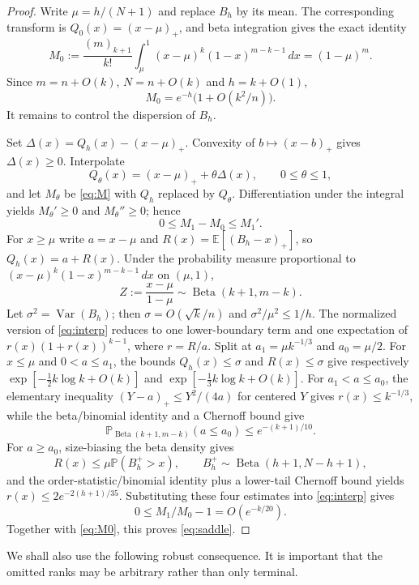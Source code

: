 \documentclass[11pt]{article}
\newcommand{\Pp}{\mathbb P}
\newcommand{\Ee}{\mathbb E}
\newcommand{\1}{\mathbf 1}
\newcommand{\Beta}{\operatorname{Beta}}
\newcommand{\fall}[2]{(#1)_{#2}}
\begin{document}
\begin{proof}
Write $\mu=h/(N+1)$ and replace $B_h$ by its mean.  The corresponding transform is
$Q_0(x)=(x-\mu)_+$, and beta integration gives the exact identity
\begin{equation}\label{eq:M0}
 M_0:=\frac{\fall m{k+1}}{k!}
 \int_\mu^1(x-\mu)^k(1-x)^{m-k-1}\,dx=(1-\mu)^m.
\end{equation}
Since $m=n+O(k)$, $N=n+O(k)$ and $h=k+O(1)$,
\[
 M_0=e^{-h}\bigl(1+O(k^2/n)\bigr).
\]
It remains to control the dispersion of $B_h$.

Set $\Delta(x)=Q_h(x)-(x-\mu)_+$.  Convexity of $b\mapsto(x-b)_+$ gives
$\Delta(x)\ge0$.  Interpolate
\[
 Q_\theta(x)=(x-\mu)_++\theta\Delta(x),\qquad0\le\theta\le1,
\]
and let $M_\theta$ be \eqref{eq:M} with $Q_h$ replaced by $Q_\theta$.
Differentiation under the integral yields $M_\theta'\ge0$ and $M_\theta''\ge0$;
hence
\begin{equation}\label{eq:interp}
 0\le M_1-M_0\le M_1'.
\end{equation}
For $x\ge\mu$ write $a=x-\mu$ and
$R(x)=\Ee[(B_h-x)_+]$, so $Q_h(x)=a+R(x)$.
Under the probability measure proportional to
$(x-\mu)^k(1-x)^{m-k-1}\,dx$ on $(\mu,1)$,
\[
 Z:=\frac{x-\mu}{1-\mu}\sim\Beta(k+1,m-k).
\]
Let $\sigma^2=\operatorname{Var}(B_h)$; then
$\sigma=O(\sqrt{k}/n)$ and $\sigma^2/\mu^2\le1/h$.
The normalized version of \eqref{eq:interp} reduces to one lower-boundary term and
one expectation of
$r(x)(1+r(x))^{k-1}$, where $r=R/a$.
Split at
$a_1=\mu k^{-1/3}$ and $a_0=\mu/2$.
For $x\le\mu$ and $0<a\le a_1$, the bounds
$Q_h(x)\le\sigma$ and $R(x)\le\sigma$ give respectively
$\exp[-\tfrac12k\log k+O(k)]$ and
$\exp[-\tfrac13k\log k+O(k)]$.
For $a_1<a\le a_0$, the elementary inequality
$(Y-a)_+\le Y^2/(4a)$ for centered $Y$ gives
$r(x)\le k^{-1/3}$, while the beta/binomial identity and a Chernoff bound give
\[
 \Pp_{\Beta(k+1,m-k)}(a\le a_0)\le e^{-(k+1)/10}.
\]
For $a\ge a_0$, size-biasing the beta density gives
\[
 R(x)\le\mu\Pp(B_h^+>x),\qquad B_h^+\sim\Beta(h+1,N-h+1),
\]
and the order-statistic/binomial identity plus a lower-tail Chernoff bound yields
$r(x)\le2e^{-2(h+1)/35}$.
Substituting these four estimates into \eqref{eq:interp} gives
\[
 0\le M_1/M_0-1=O(e^{-k/20}).
\]
Together with \eqref{eq:M0}, this proves \eqref{eq:saddle}.
\end{proof}

We shall also use the following robust consequence.  It is important that the omitted
ranks may be arbitrary rather than only terminal.
\end{document}

